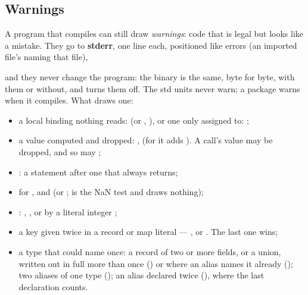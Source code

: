 \subsection{Warnings}
\label{sec:warnings}

A program that compiles can still draw \emph{warnings}: code that is
legal but looks like a mistake. They go to \textbf{stderr}, one line
each, positioned like errors (an imported file's naming that file),

\begin{center}
\end{center}

\noindent and they never change the program: the binary is the same,
byte for byte, with them or without, and  turns them off. The
std units never warn; a package warns when it compiles. What draws one:

\begin{itemize}[nosep]
\item a local binding nothing reads:  (or
  , ), or one only assigned to:
  ;
\item a value computed and dropped: ,
   (for \ic{==} it adds ). A call's value may be dropped, and so may ;
\item {}: a statement after one that always returns;
\item {} for , and  (or \ic{>};  is the NaN test and draws
  nothing);
\item {}: \ic{/}, \ic{\%}, \ic{/=} or \ic{\%=} by a
  literal integer ;
\item a key given twice in a record or map literal --- , or . The last one wins;
\item a type that  could name once: a record of two or more
  fields, or a union, written out in full more than once () or where an alias names it already
  (); two aliases of one type
  (); an alias declared
  twice (), where the last
  declaration counts.
\end{itemize}

